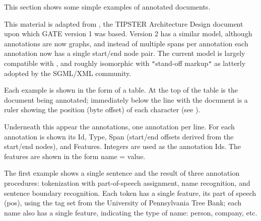 
This section shows some simple examples of annotated documents.

This material is adapted from \cite{Gri96b}, the TIPSTER Architecture Design
document upon which GATE version 1 was based. Version 2 has a similar model,
although annotations are now graphs, and instead of multiple spans per
annotation each annotation now has a single start/end node pair. The current
model is largely compatible with \cite{Bir99}, and roughly isomorphic with
{\tt{}"{}}stand-off markup{\tt{}"{}} as latterly adopted by the SGML/XML
community.

Each example is shown in the form of a table. At the top of the table is the
document being annotated; immediately below the line with the document is a
ruler showing the position (byte offset) of each character 
(see ).

Underneath this appear the annotations, one annotation per line. 
For each annotation is shown its Id, Type, Span (start/end offsets derived 
from the start/end nodes), and Features. Integers are used as the annotation 
Ids.  The features are shown in the form name = value.

The first example shows a single sentence and the result of three
annotation procedures: tokenization with part-of-speech assignment, name
recognition, and sentence boundary recognition. Each token has a single
feature, its part of speech (pos), using the tag set from the University of
Pennsylvania Tree Bank; each name also has a single feature, indicating the
type of name: person, company, etc.


